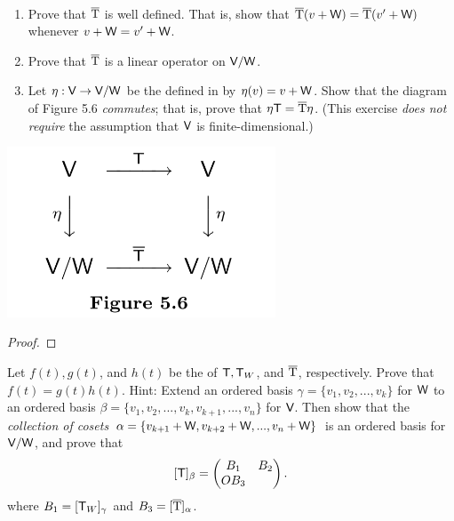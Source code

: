 \begin{exercise} \label{exercise 5.4.27} \ 

\begin{enumerate}
\item Prove that \(\mathrm{\overline{T}}\) is well defined.
That is, show that \(\mathrm{\overline{T}}(v + \textsf{W}) = \mathrm{\overline{T}}(v' + \textsf{W})\) whenever \(v + \textsf{W} = v' + \textsf{W}\).
\item Prove that \(\mathrm{\overline{T}}\) is a linear operator on \(\textsf{V}/\textsf{W}\).
\item Let \(\eta : \textsf{V} \to \textsf{V}/\textsf{W}\) be the \LTRAN{} defined in  by \(\eta(v) = v + \textsf{W}\).
Show that the diagram of Figure 5.6 \emph{commutes}; that is, prove that \(\eta \textsf{T} = \mathrm{\overline{T}} \eta\).
(This exercise \emph{does not require} the assumption that \(\textsf{V}\) is finite-dimensional.)
\end{enumerate}

\includegraphics[width=8cm]{images/figure-5-6.png}

\end{exercise}

\begin{proof}
\end{proof}

\begin{exercise} \label{exercise 5.4.28}
Let \(f(t), g(t)\), and \(h(t)\) be the \CPOLY{} of \(\textsf{T}, \textsf{T}_W\), and \(\mathrm{\overline{T}}\), respectively.
Prove that \(f(t) = g(t)h(t)\).
Hint: Extend an ordered basis \(\gamma = \{ v_1, v_2, ..., v_k \}\) for \(\textsf{W}\) to an ordered basis \(\beta = \{ v_1, v_2, ..., v_k, v_{k + 1}, ..., v_n \}\) for \(\textsf{V}\).
Then show that the \emph{collection of cosets} \(\alpha = \{ v_{k + 1} + \textsf{W}, v_{k + 2} + \textsf{W}, ..., v_n + \textsf{W} \}\) is an ordered basis for \(\textsf{V}/\textsf{W}\), and prove that
\[
    [\textsf{T}]_{\beta} = \begin{pmatrix}
        B_1 & B_2 \\ O B_3
    \end{pmatrix}.
\]
where \(B_1 = [\textsf{T}_W]_{\gamma}\) and \(B_3 = [\mathrm{\overline{T}}]_{\alpha}\).
\end{exercise}

